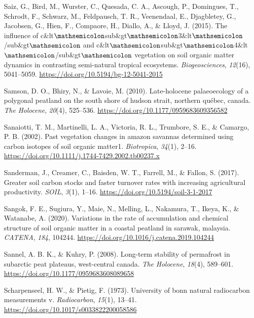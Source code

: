 \documentclass[]{article}
\begin{document}
\leavevmode\hypertarget{ref-Saiz_2015}{}%
Saiz, G., Bird, M., Wurster, C., Quesada, C. A., Ascough, P., Domingues,
T., Schrodt, F., Schwarz, M., Feldpausch, T. R., Veenendaal, E.,
Djagbletey, G., Jacobsen, G., Hien, F., Compaore, H., Diallo, A., \&
Lloyd, J. (2015). The influence of
c\&lt\(\mathsemicolon\)sub\&gt\(\mathsemicolon\)3\&lt\(\mathsemicolon\)/sub\&gt\(\mathsemicolon\)
and
c\&lt\(\mathsemicolon\)sub\&gt\(\mathsemicolon\)4\&lt\(\mathsemicolon\)/sub\&gt\(\mathsemicolon\)
vegetation on soil organic matter dynamics in contrasting semi-natural
tropical ecosystems. \emph{Biogeosciences}, \emph{12}(16), 5041--5059.
\url{https://doi.org/10.5194/bg-12-5041-2015}

\leavevmode\hypertarget{ref-Ouzilleau_Samson_2010}{}%
Samson, D. O., Bhiry, N., \& Lavoie, M. (2010). Late-holocene
palaeoecology of a polygonal peatland on the south shore of hudson
strait, northern québec, canada. \emph{The Holocene}, \emph{20}(4),
525--536. \url{https://doi.org/10.1177/0959683609356582}

\leavevmode\hypertarget{ref-Sanaiotti_2002}{}%
Sanaiotti, T. M., Martinelli, L. A., Victoria, R. L., Trumbore, S. E.,
\& Camargo, P. B. (2002). Past vegetation changes in amazon savannas
determined using carbon isotopes of soil organic matter1.
\emph{Biotropica}, \emph{34}(1), 2--16.
\url{https://doi.org/10.1111/j.1744-7429.2002.tb00237.x}

\leavevmode\hypertarget{ref-Sanderman_2017}{}%
Sanderman, J., Creamer, C., Baisden, W. T., Farrell, M., \& Fallon, S.
(2017). Greater soil carbon stocks and faster turnover rates with
increasing agricultural productivity. \emph{SOIL}, \emph{3}(1), 1--16.
\url{https://doi.org/10.5194/soil-3-1-2017}

\leavevmode\hypertarget{ref-Sangok_2020}{}%
Sangok, F. E., Sugiura, Y., Maie, N., Melling, L., Nakamura, T., Ikeya,
K., \& Watanabe, A. (2020). Variations in the rate of accumulation and
chemical structure of soil organic matter in a coastal peatland in
sarawak, malaysia. \emph{CATENA}, \emph{184}, 104244.
\url{https://doi.org/10.1016/j.catena.2019.104244}

\leavevmode\hypertarget{ref-Sannel_2008}{}%
Sannel, A. B. K., \& Kuhry, P. (2008). Long-term stability of permafrost
in subarctic peat plateaus, west-central canada. \emph{The Holocene},
\emph{18}(4), 589--601. \url{https://doi.org/10.1177/0959683608089658}

\leavevmode\hypertarget{ref-Scharpenseel_1973}{}%
Scharpenseel, H. W., \& Pietig, F. (1973). University of bonn natural
radiocarbon measurements v. \emph{Radiocarbon}, \emph{15}(1), 13--41.
\url{https://doi.org/10.1017/s0033822200058586}
\end{document}
